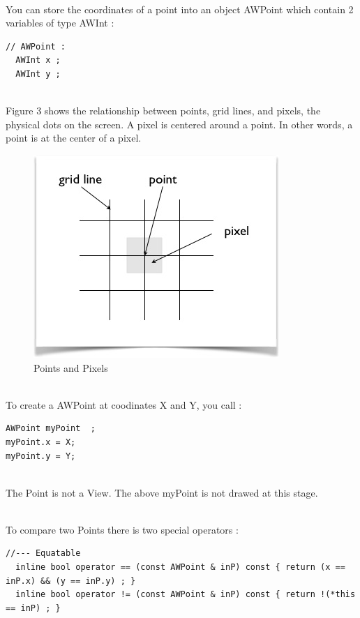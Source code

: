 \documentclass[a4paper,11pt]{extarticle}
\begin{document}
~\\You can store the coordinates of a point into an object AWPoint which contain 2 variables of type AWInt :

\begin{lstlisting}[language=Arduinonl]
// AWPoint :
  AWInt x ;
  AWInt y ;
\end{lstlisting}

~\\Figure 3 shows the relationship between points, grid lines, and pixels, the physical dots on the screen. 
A pixel is centered around a point. In other words, a point is at the center of a pixel.

\begin{figure}[htbp]
   \centering
   \includegraphics[scale=0.8]{AWFig3.png} 
   \caption{Points and Pixels}
   \label{fig:3 }
\end{figure}


~\\To create a AWPoint at coodinates X and Y, you call :
\begin{lstlisting}[language=Arduinonl]
AWPoint myPoint  ;
myPoint.x = X;
myPoint.y = Y;
\end{lstlisting}

~\\ The Point is not a View. The above myPoint is not drawed at this stage.

~\\ To compare two Points there is two special operators :
\begin{lstlisting}[language=Arduinonl]
//--- Equatable
  inline bool operator == (const AWPoint & inP) const { return (x == inP.x) && (y == inP.y) ; }
  inline bool operator != (const AWPoint & inP) const { return !(*this == inP) ; }
\end{lstlisting}
\end{document}
